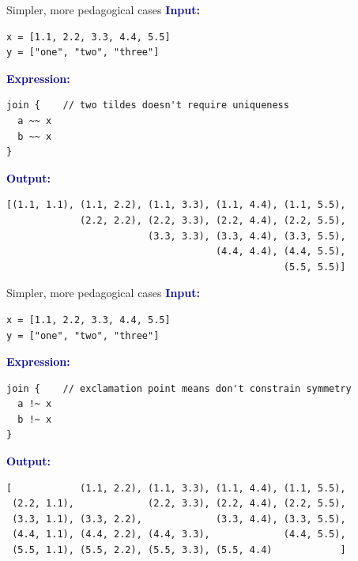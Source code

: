 \documentclass[aspectratio=169]{beamer}
\begin{document}
\begin{frame}[fragile]{Simpler, more pedagogical cases}
\vspace{0.25 cm}
\textcolor{darkblue}{\large\bf Input:}

\begin{verbatim}
x = [1.1, 2.2, 3.3, 4.4, 5.5]
y = ["one", "two", "three"]
\end{verbatim}

\vspace{0.25 cm}
\textcolor{darkblue}{\large\bf Expression:}

\begin{verbatim}
join {    // two tildes doesn't require uniqueness
  a ~~ x
  b ~~ x
}
\end{verbatim}

\vspace{0.25 cm}
\textcolor{darkblue}{\large\bf Output:}

\begin{verbatim}
[(1.1, 1.1), (1.1, 2.2), (1.1, 3.3), (1.1, 4.4), (1.1, 5.5),
             (2.2, 2.2), (2.2, 3.3), (2.2, 4.4), (2.2, 5.5),
                         (3.3, 3.3), (3.3, 4.4), (3.3, 5.5),
                                     (4.4, 4.4), (4.4, 5.5),
                                                 (5.5, 5.5)]
\end{verbatim}
\end{frame}

\begin{frame}[fragile]{Simpler, more pedagogical cases}
\vspace{0.25 cm}
\textcolor{darkblue}{\large\bf Input:}

\begin{verbatim}
x = [1.1, 2.2, 3.3, 4.4, 5.5]
y = ["one", "two", "three"]
\end{verbatim}

\vspace{0.25 cm}
\textcolor{darkblue}{\large\bf Expression:}

\begin{verbatim}
join {    // exclamation point means don't constrain symmetry
  a !~ x
  b !~ x
}
\end{verbatim}

\vspace{0.25 cm}
\textcolor{darkblue}{\large\bf Output:}
\begin{verbatim}
[            (1.1, 2.2), (1.1, 3.3), (1.1, 4.4), (1.1, 5.5),
 (2.2, 1.1),             (2.2, 3.3), (2.2, 4.4), (2.2, 5.5),
 (3.3, 1.1), (3.3, 2.2),             (3.3, 4.4), (3.3, 5.5),
 (4.4, 1.1), (4.4, 2.2), (4.4, 3.3),             (4.4, 5.5),
 (5.5, 1.1), (5.5, 2.2), (5.5, 3.3), (5.5, 4.4)            ]
\end{verbatim}
\end{frame}
\end{document}
